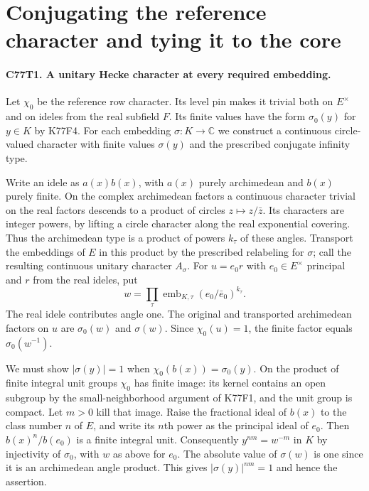 \section{Conjugating the reference character and tying it to the core}

\paragraph{C77T1. A unitary Hecke character at every required embedding.}
Let $\chi_0$ be the reference row character. Its level pin makes
it trivial both on $E^\times$ and on ideles from the real
subfield $F$. Its finite values have the form $\sigma_0(y)$ for
$y\in K$ by K77F4. For each embedding $\sigma:K\to\mathbb C$
we construct a continuous circle-valued character with finite
values $\sigma(y)$ and the prescribed conjugate infinity type.

Write an idele as $a(x)b(x)$, with $a(x)$ purely archimedean
and $b(x)$ purely finite. On the complex archimedean factors a
continuous character trivial on the real factors descends to a
product of circles $z\mapsto z/\bar z$. Its characters are
integer powers, by lifting a circle character along the real
exponential covering. Thus the archimedean type is a product
of powers $k_\tau$ of these angles. Transport the embeddings of
$E$ in this product by the prescribed relabeling for $\sigma$;
call the resulting continuous unitary character $A_\sigma$.
For $u=e_0 r$ with $e_0\in E^\times$ principal and $r$ from
the real ideles, put
\[
  w=\prod_\tau \operatorname{emb}_{K,\tau}
                  (e_0/\bar e_0)^{k_\tau}.
\]
The real idele contributes angle one. The original and transported
archimedean factors on $u$ are $\sigma_0(w)$ and $\sigma(w)$.
Since $\chi_0(u)=1$, the finite factor equals $\sigma_0(w^{-1})$.

We must show $|\sigma(y)|=1$ when
$\chi_0(b(x))=\sigma_0(y)$. On the product of finite integral
unit groups $\chi_0$ has finite image: its kernel contains an open
subgroup by the small-neighborhood argument of K77F1, and the
unit group is compact. Let $m>0$ kill that image. Raise the
fractional ideal of $b(x)$ to the class number $n$ of $E$, and
write its $n$th power as the principal ideal of $e_0$.
Then $b(x)^n/b(e_0)$ is a finite integral unit. Consequently
$y^{nm}=w^{-m}$ in $K$ by injectivity of $\sigma_0$, with $w$
as above for $e_0$. The absolute value of $\sigma(w)$ is one
since it is an archimedean angle product. This gives
$|\sigma(y)|^{nm}=1$ and hence the assertion.


